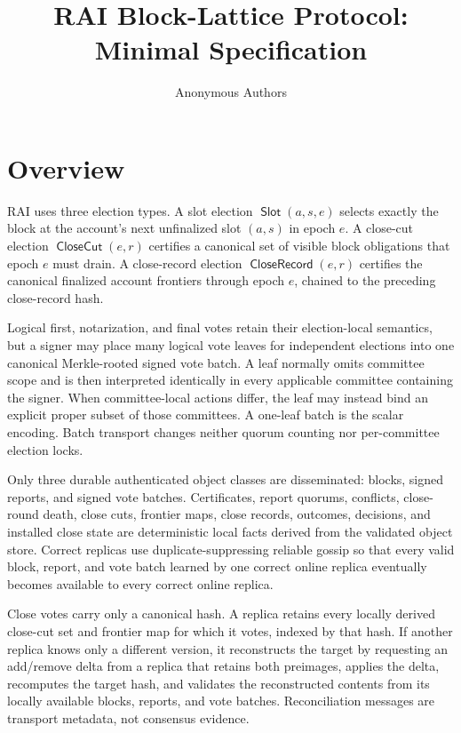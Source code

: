 \documentclass[sigplan,twocolumn,review,anonymous]{acmart}
\title{RAI Block-Lattice Protocol: Minimal Specification}
\author{Anonymous Authors}
\affiliation{%
  \institution{Paper under review}
  \city{}
  \country{}
}
\newcommand{\func}[1]{\operatorname{\mathsf{#1}}}
\newcommand{\Slot}{\func{Slot}}
\newcommand{\CloseCut}{\func{CloseCut}}
\newcommand{\CloseRecord}{\func{CloseRecord}}
\begin{document}
\maketitle

\section{Overview}

RAI uses three election types.  A slot election \(\Slot(a,s,e)\) selects exactly the block at the
account's next unfinalized slot \((a,s)\) in epoch \(e\).  A close-cut election
\(\CloseCut(e,r)\) certifies a canonical set of visible block obligations that epoch \(e\) must
drain.  A close-record election \(\CloseRecord(e,r)\) certifies the canonical finalized account
frontiers through epoch \(e\), chained to the preceding close-record hash.

Logical first, notarization, and final votes retain their election-local semantics, but a signer may
place many logical vote leaves for independent elections into one canonical Merkle-rooted signed vote
batch.  A leaf normally omits committee scope and is then interpreted identically in every applicable
committee containing the signer.  When committee-local actions differ, the leaf may instead bind an
explicit proper subset of those committees.  A one-leaf batch is the scalar encoding.  Batch transport
changes neither quorum counting nor per-committee election locks.

Only three durable authenticated object classes are disseminated: blocks, signed reports, and signed vote batches.  Certificates, report quorums, conflicts, close-round death, close cuts, frontier maps, close
records, outcomes, decisions, and installed close state are deterministic local facts derived from the
validated object store.  Correct replicas use duplicate-suppressing reliable gossip so that every valid
block, report, and vote batch learned by one correct online replica eventually becomes available to every
correct online replica.

Close votes carry only a canonical hash.  A replica retains every locally derived close-cut set and
frontier map for which it votes, indexed by that hash.  If another replica knows only a different
version, it reconstructs the target by requesting an add/remove delta from a replica that retains both
preimages, applies the delta, recomputes the target hash, and validates the reconstructed contents from
its locally available blocks, reports, and vote batches.  Reconciliation messages are transport metadata, not
consensus evidence.
\end{document}

